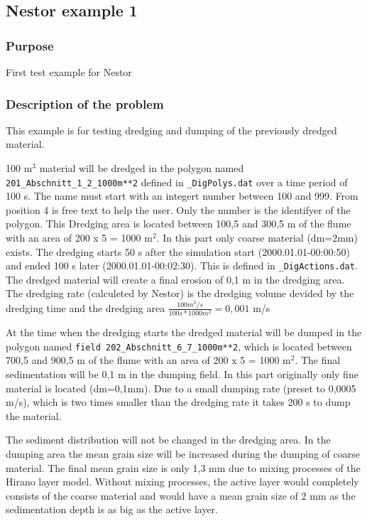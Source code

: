 \subsection{Nestor example 1}
%

%
\subsubsection{Purpose}
%
First test example for Nestor
%
\subsubsection{Description of the problem}
%
This example is for testing dredging and dumping of the previously dredged material.

100 m$^3$ material will be dredged in the polygon named \texttt{201\_Abschnitt\_1\_2\_1000m**2}  defined in \texttt{\_DigPolys.dat} over a time period of 100 s.
The name must start with an integert number between 100 and 999. From position 4 is free text to help the user. 
Only the number is the identifyer of the polygon. This Dredging area is located between 100,5 and 300,5 m of the flume with an area of 200 x 5 = 1000 m$^2$. In this part only 
coarse material (dm=2mm) exists.
The dredging starts 50 s after the simulation start (2000.01.01-00:00:50) and ended 100 s later
(2000.01.01-00:02:30). This is defined in \texttt{\_DigActions.dat}.
The dredged material will create a final erosion of 0,1 m in the dredging area.
The dredging rate (calculeted by Nestor) is the dredging volume devided by the dredging time and the dredging area 
$\frac{100 m^3/s}{100 s*1000 m^2}=0,001$ m/s

At the time when the dredging starts the dredged material will 
be dumped in the polygon named \texttt{field 202\_Abschnitt\_6\_7\_1000m**2}, which is located between 700,5 and 900,5 m of the flume 
with an area of 200 x 5 = 1000 m$^2$. The final sedimentation will be 0,1 m in the dumping field.
In this part originally only fine material is located (dm=0,1mm).  
Due to a small dumping rate (preset to 0,0005 m/s), which is two times smaller than the dredging rate it takes 200 s to dump the material.

The sediment distribution will not be changed in the dredging area. In the 
dumping area the mean grain size will be increased during the dumping of coarse material. 
The final mean grain size is only 1,3 mm due to mixing processes of the Hirano layer model.
Without mixing processes, the active layer would completely consists of the coarse material and would have
a mean grain size of 2 mm as the sedimentation depth is as big as the active layer.

